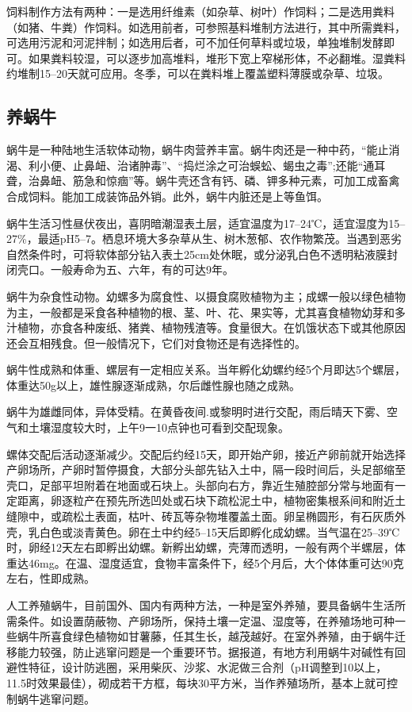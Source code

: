 \documentclass{ctexbook}
\begin{document}
饲料制作方法有两种：一是选用纤维素（如杂草、树叶）作饲料；二是选用粪料（如猪、牛粪）作饲料。如选用前者，可参照基料堆制方法进行，其中所需粪料，可选用污泥和河泥拌制；如选用后者，可不加任何草料或垃圾，单独堆制发酵即可。如果粪料较湿，可以逐步加高堆料，堆形下宽上窄梯形体，不必翻堆。湿粪料约堆制15--20天就可应用。冬季，可以在粪料堆上覆盖塑料薄膜或杂草、垃圾。
\subsection{养蜗牛}
蜗牛是一种陆地生活软体动物，蜗牛肉营养丰富。蜗牛肉还是一种中药，“能止消渴、利小便、止鼻衄、治诸肿毒”、“捣烂涂之可治蜈蚣、蝎虫之毒”;还能“通耳聋，治鼻衄、筋急和惊痼”等。蜗牛壳还含有钙、磷、钾多种元素，可加工成畜禽合成饲料。能加工成装饰品外销。此外，蜗牛内脏还是上等鱼饵。

蜗牛生活习性昼伏夜出，喜阴暗潮湿表土层，适宜温度为17--24℃，适宜湿度为15--27\%，最适pH5--7。栖息环境大多杂草从生、树木葱郁、农作物繁茂。当遇到恶劣自然条件时，可将软体部分钻入表土25cm处休眠，或分泌乳白色不透明粘液膜封闭壳口。一般寿命为五、六年，有的可达9年。

蜗牛为杂食性动物。幼螺多为腐食性、以摄食腐败植物为主；成螺一般以绿色植物为主，一般都是采食各种植物的根、茎、叶、花、果实等，尤其喜食植物幼芽和多汁植物，亦食各种废纸、猪粪、植物残渣等。食量很大。在饥饿状态下或其他原因还会互相残食。但一般情况下，它们对食物还是有选择性的。

蜗牛性成熟和体重、螺层有一定相应关系。当年孵化幼螺约经5个月即达5个螺层，体重达50g以上，雄性腺逐渐成熟，尔后雌性腺也随之成熟。

蜗牛为雄雌同体，异体受精。在黄昏夜间.或黎明时进行交配，雨后晴天下雾、空气和土壤湿度较大时，上午9一10点钟也可看到交配现象。

螺体交配后活动逐渐减少。交配后约经15天，即开始产卵，接近产卵前就开始选择产卵场所，产卵时暂停摄食，大部分头部先钻入土中，隔一段时间后，头足部缩至壳口，足部平坦附着在地面或石块上。头部向右方，靠近生殖腔部分常与地面有一定距离，卵逐粒产在预先所选凹处或石块下疏松泥土中，植物密集根系间和附近土缝隙中，或疏松土表面，枯叶、砖瓦等杂物堆覆盖土面。卵呈椭圆形，有石灰质外壳，乳白色或淡青黄色。卵在土中约经5--15天后即孵化成幼螺。当气温在25--39℃时，卵经12天左右即孵出幼螺。新孵出幼螺，壳薄而透明，一般有两个半螺层，体重达46mg。在温、湿度适宜，食物丰富条件下，经5个月后，大个体体重可达90克左右，性即成熟。

人工养殖蜗牛，目前国外、国内有两种方法，一种是室外养殖，要具备蜗牛生活所需条件。如设置荫蔽物、产卵场所，保持土壤一定温、湿度等，在养殖场地可种一些蜗牛所喜食绿色植物如甘薯藤，任其生长，越茂越好。在室外养殖，由于蜗牛迁移能力较强，防止逃窜问题是一个重要环节。据报道，有地方利用蜗牛对碱性有回避性特征，设计防逃圈，采用柴灰、沙浆、水泥做三合剂（pH调整到10以上，11.5时效果最佳），砌成若干方框，每块30平方米，当作养殖场所，基本上就可控制蜗牛逃窜问题。
\end{document}
